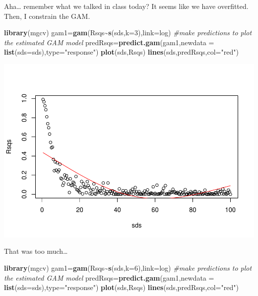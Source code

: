 \documentclass[
]{book}
\newenvironment{Shaded}{\begin{snugshade}}{\end{snugshade}}
\newcommand{\AttributeTok}[1]{\textcolor[rgb]{0.13,0.29,0.53}{#1}}
\newcommand{\CommentTok}[1]{\textcolor[rgb]{0.56,0.35,0.01}{\textit{#1}}}
\newcommand{\DecValTok}[1]{\textcolor[rgb]{0.00,0.00,0.81}{#1}}
\newcommand{\FunctionTok}[1]{\textcolor[rgb]{0.13,0.29,0.53}{\textbf{#1}}}
\newcommand{\NormalTok}[1]{#1}
\newcommand{\OtherTok}[1]{\textcolor[rgb]{0.56,0.35,0.01}{#1}}
\newcommand{\SpecialCharTok}[1]{\textcolor[rgb]{0.81,0.36,0.00}{\textbf{#1}}}
\newcommand{\StringTok}[1]{\textcolor[rgb]{0.31,0.60,0.02}{#1}}
\begin{document}
Aha\ldots{} remember what we talked in class today? It seems like we have overfitted. Then, I constrain the GAM.

\begin{Shaded}
\begin{Highlighting}[]
\FunctionTok{library}\NormalTok{(mgcv)}
\NormalTok{gam1}\OtherTok{=}\FunctionTok{gam}\NormalTok{(Rsqs}\SpecialCharTok{\textasciitilde{}}\FunctionTok{s}\NormalTok{(sds,}\AttributeTok{k=}\DecValTok{3}\NormalTok{),}\AttributeTok{link=}\NormalTok{log)}
\CommentTok{\#make predictions to plot the estimated GAM model}
\NormalTok{predRsqs}\OtherTok{=}\FunctionTok{predict.gam}\NormalTok{(gam1,}\AttributeTok{newdata =} \FunctionTok{list}\NormalTok{(}\AttributeTok{sds=}\NormalTok{sds),}\AttributeTok{type=}\StringTok{"response"}\NormalTok{)}
\FunctionTok{plot}\NormalTok{(sds,Rsqs)}
\FunctionTok{lines}\NormalTok{(sds,predRsqs,}\AttributeTok{col=}\StringTok{"red"}\NormalTok{)}
\end{Highlighting}
\end{Shaded}

\includegraphics{ECOMODbook_files/figure-latex/a6.33-1.pdf}

That was too much\ldots{}

\begin{Shaded}
\begin{Highlighting}[]
\FunctionTok{library}\NormalTok{(mgcv)}
\NormalTok{gam1}\OtherTok{=}\FunctionTok{gam}\NormalTok{(Rsqs}\SpecialCharTok{\textasciitilde{}}\FunctionTok{s}\NormalTok{(sds,}\AttributeTok{k=}\DecValTok{6}\NormalTok{),}\AttributeTok{link=}\NormalTok{log)}
\CommentTok{\#make predictions to plot the estimated GAM model}
\NormalTok{predRsqs}\OtherTok{=}\FunctionTok{predict.gam}\NormalTok{(gam1,}\AttributeTok{newdata =} \FunctionTok{list}\NormalTok{(}\AttributeTok{sds=}\NormalTok{sds),}\AttributeTok{type=}\StringTok{"response"}\NormalTok{)}
\FunctionTok{plot}\NormalTok{(sds,Rsqs)}
\FunctionTok{lines}\NormalTok{(sds,predRsqs,}\AttributeTok{col=}\StringTok{"red"}\NormalTok{)}
\end{Highlighting}
\end{Shaded}
\end{document}
